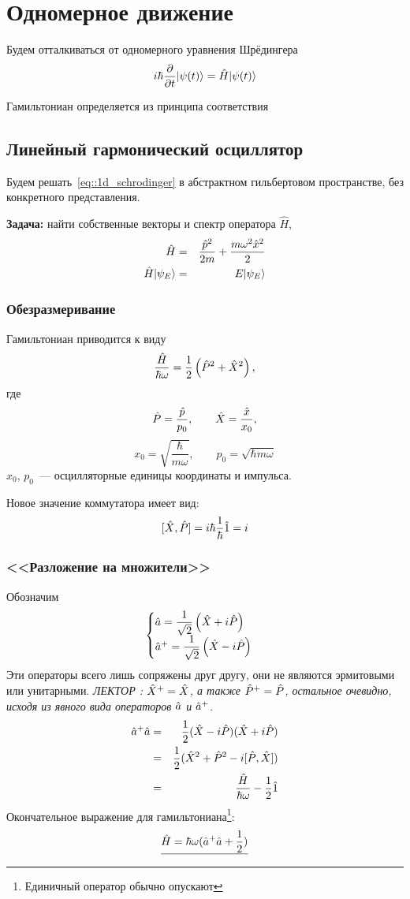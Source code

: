 \chapter{Одномерное движение}
Будем отталкиваться от одномерного уравнения Шрёдингера
\begin{equation}
    i \hbar \dfrac{\partial }{\partial t} | \psi(t) \rangle = \hat H | \psi(t) \rangle
    \label{eq::1d_schrodinger}
\end{equation}

Гамильтониан определяется из принципа соответствия

\section{Линейный гармонический осциллятор}
Будем решать~\eqref{eq::1d_schrodinger} в абстрактном гильбертовом пространстве, без конкретного представления.

\textbf{Задача:} найти собственные векторы и спектр оператора $\hat H$,
\begin{eqnarray*}
    \Hat H &=& \dfrac{\Hat p^2}{2m} + \dfrac{m \omega^2 \Hat x^2}{2}\\
    \Hat H | \psi_E \rangle &=& E | \psi_E \rangle
\end{eqnarray*}
\subsection{Обезразмеривание}
Гамильтониан приводится к виду
$$
    \dfrac{\Hat H}{\hbar \omega} = \dfrac{1}{2} \left( \Hat P^2 + \Hat X^2 \right),
$$
где
$$
    \Hat P = \dfrac{\Hat p}{p_0}, \qquad \Hat X = \dfrac{\Hat x}{x_0},
$$
$$
    x_0 = \sqrt{\dfrac{\hbar}{m\omega}}, \qquad p_0 = \sqrt{\hbar m \omega}
$$
$x_0$, $p_0$~--- осцилляторные единицы координаты и импульса.

Новое значение коммутатора имеет вид:
$$
    [\Hat X, \Hat P] = i \hbar \dfrac{1}{\hbar} \Hat 1 = i
$$
\subsection{<<Разложение на множители>>}
Обозначим
$$
    \begin{cases}
        \Hat a = \dfrac{1}{\sqrt{2}} \left(\Hat X + i \Hat P \right)\\
        \Hat a^+ = \dfrac{1}{\sqrt{2}} \left(\Hat X - i \Hat P \right)
    \end{cases}
$$
Эти операторы всего лишь сопряжены друг другу, они не являются эрмитовыми или унитарными. \textsl{ЛЕКТОР : $\Hat{X}^{+}=\Hat{X}$, а также
$\Hat{P}^{+}=\Hat{P}$, остальное очевидно, исходя из явного вида операторов $\Hat a$ и $\Hat a^+$}.
\begin{eqnarray*}
    \Hat a^+ \Hat a &=& \dfrac12 (\Hat X - i \Hat P)(\Hat X + i \Hat P)\\
                    &=& \dfrac12 (\Hat X^2 + \Hat P^2 - i[\Hat P, \Hat X])\\
                    &=& \dfrac{\Hat H}{\hbar \omega} - \dfrac12 \hat 1
\end{eqnarray*}
Окончательное выражение для гамильтониана\footnote{Единичный оператор обычно опускают}:
$$
    \underline{\hat H = \hbar \omega (\Hat a^+ \Hat a + \dfrac12)}
$$
